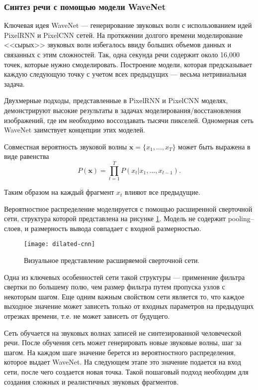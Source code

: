 \subsubsection{Синтез речи с помощью модели WaveNet}
\label{section:wavenet}
Ключевая идея WaveNet --- генерирование звуковых волн с использованием идей PixelRNN \cite{van2016pixel} и PixelCNN\cite{oord2016conditional} сетей. На протяжении долгого времени моделирование <<сырых>> звуковых волн избегалось ввиду больших объемов данных и связанных с этим сложностей. Так, одна секунда речи содержит около 16,000 точек, которые нужно смоделировать. Построение модели, которая предсказывает каждую следующую точку с учетом всех предыдущих --- весьма нетривиальная задача.

Двухмерные подходы, представленные в PixelRNN и PixelCNN моделях, демонстрируют высокие результаты в задачах моделирования/восстановления изображений, где им необходимо воссоздавать тысячи пикселей. Одномерная сеть WaveNet заимствует концепции этих моделей.

Совместная вероятность звуковой волны $\mathbf{x} = \{x_1, \dots, x_T\}$ может быть выражена в виде равенства
$$P(\mathbf{x}) = \prod_{t = 1}^{T} P(x_t | x_1, \dots, x_{t - 1}).$$

Таким образом на каждый фрагмент $x_t$ влияют все предыдущие.

Вероятностное распределение моделируется с помощью расширенной сверточной сети, структура которой представлена на рисунке \ref{fig:dilated-cnn}. Модель не содержит pooling--слоев, и размерность вывода совпадает с входной размерностью.

\begin{figure}[h]
	\centering
	\texttt{[image: dilated-cnn]}
	\caption{Визуальное представление расширяемой сверточной сети.}
	\label{fig:dilated-cnn}
\end{figure}

Одна из ключевых особенностей сети такой структуры --- применение фильтра свертки по большему полю, чем размер фильтра путем пропуска узлов с некоторым шагом. Еще одним важным свойством сети является то, что каждое выходное значение может зависеть только от входных параметров на предыдущих отрезках времени, т.е. не может зависеть от будущего.

Сеть обучается на звуковых волнах записей не синтезированной человеческой речи. После обучения сеть может генерировать новые звуковые волны, шаг за шагом. На каждом шаге значение берется из вероятностного распределения, которое выдает WaveNet. На следующем этапе это значение подается на вход сети, после чего создается новая точка. Такой пошаговый подход необходим для создания сложных и реалистичных звуковых фрагментов.

